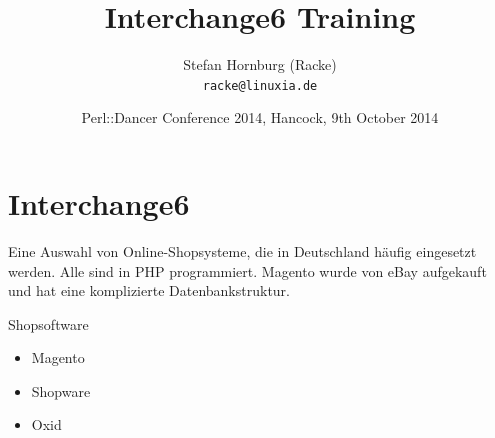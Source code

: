 \usepackage[utf8]{inputenc}
\usepackage[T1]{fontenc}
\usepackage{mathptmx}
\usepackage[scaled=.90]{helvet}
\usepackage{courier}
\usepackage{caption}
\captionsetup{labelformat=empty,labelsep=none}
\usepackage{verbatim}
\usepackage{hyperref}
\usepackage{listings}
\usepackage{ulem}
\lstset{language=Perl,basicstyle=\normalsize,tabsize=3,showstringspaces=false}

\title{Interchange6 Training}
\author[racke]{Stefan Hornburg (Racke)\\ \texttt{racke@linuxia.de}}
\date{Perl::Dancer Conference 2014, Hancock, 9th October 2014}


\maketitle{}

\begin{frame}
  \titlepage
\end{frame}


\tableofcontents

\section{Interchange6}

Eine Auswahl von Online-Shopsysteme, die in Deutschland häufig eingesetzt
werden. Alle sind in PHP programmiert. Magento wurde von eBay aufgekauft
und hat eine komplizierte Datenbankstruktur.
 
\begin{frame}{Shopsoftware}
  \begin{itemize}
  \item Magento
  \item Shopware
  \item Oxid
  \end{itemize}
\end{frame}

